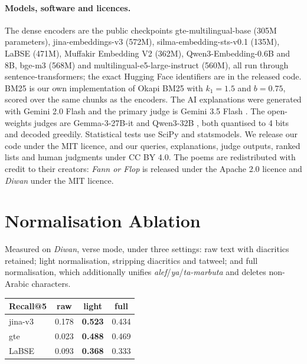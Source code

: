 \documentclass[11pt]{article}
\begin{document}
\paragraph{Models, software and licences.} The dense encoders are the public checkpoints gte-multilingual-base (305M parameters), jina-embeddings-v3 (572M), silma-embedding-sts-v0.1 (135M), LaBSE (471M), Muffakir Embedding V2 (362M), Qwen3-Embedding-0.6B and 8B, bge-m3 (568M) and multilingual-e5-large-instruct (560M), all run through sentence-transformers; the exact Hugging Face identifiers are in the released code. BM25 \citep{robertson2009bm25} is our own implementation of Okapi BM25 with $k_1{=}1.5$ and $b{=}0.75$, scored over the same chunks as the encoders. The AI explanations were generated with Gemini 2.0 Flash and the primary judge is Gemini 3.5 Flash \citep{google2026gemini}. The open-weights judges are Gemma-3-27B-it \citep{gemma2025gemma3} and Qwen3-32B \citep{yang2025qwen3}, both quantised to 4 bits and decoded greedily. Statistical tests use SciPy and statsmodels. We release our code under the MIT licence, and our queries, explanations, judge outputs, ranked lists and human judgments under CC BY 4.0. The poems are redistributed with credit to their creators: \textit{Fann or Flop} is released under the Apache 2.0 licence and \textit{Diwan} under the MIT licence.

\section{Normalisation Ablation}
\label{app:norm}
Measured on \textit{Diwan}, verse mode, under three settings: raw text with diacritics retained; light normalisation, stripping diacritics and tatweel; and full normalisation, which additionally unifies \textit{alef}/\textit{ya}/\textit{ta-marbuta} and deletes non-Arabic characters.

\begin{center}\small
\begin{tabular}{lccc}
\toprule
Recall@5 & raw & light & full \\
\midrule
jina-v3 & 0.178 & \textbf{0.523} & 0.434 \\
gte & 0.023 & \textbf{0.488} & 0.469 \\
LaBSE & 0.093 & \textbf{0.368} & 0.333 \\
\bottomrule
\end{tabular}
\end{center}
\end{document}
